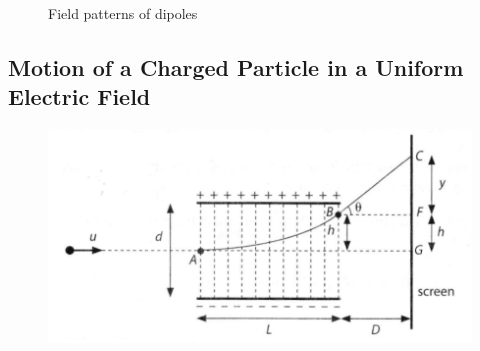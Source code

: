 \documentclass[../../../main.tex]{subfiles}
\begin{document}
\begin{figure}[h]
    \centering
    \qquad
    \caption{Field patterns of dipoles}
\end{figure}

\newpage

\subsection{Motion of a Charged Particle in a Uniform Electric Field}

\begin{figure}[h]
    \centering
    \includegraphics[scale=0.6]{figures/6.png}
\end{figure}
\end{document}
